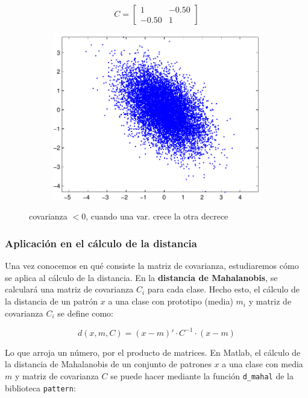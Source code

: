 \documentclass[11pt]{scrartcl}
\begin{document}
\begin{figure}[h!]
 \centering
 \begin{subfigure}{0.49\textwidth}
$$
C = \begin{bmatrix}
1    & -0.50 \\
-0.50 & 1   
\end{bmatrix}
$$ 
\end{subfigure}
 \begin{subfigure}{0.39\textwidth}
    \includegraphics[width=\textwidth]{img/matriz_covarianza_decreciente}
 \end{subfigure}
 \caption{covarianza $< 0$, cuando una var. crece la otra decrece}
\end{figure}

\subsubsection{Aplicación en el cálculo de la distancia}

Una vez conocemos en qué consiste la matriz de covarianza, estudiaremos cómo se
aplica al cálculo de la distancia. En la \textbf{distancia de Mahalanobis}, se
calculará una matriz de covarianza $C_i$ para cada clase. Hecho esto, el cálculo
de la distancia de un patrón $x$ a una clase con prototipo (media) $m_i$ y
matriz de covarianza $C_i$ se define como:

$$
d(x,m,C) = (x-m)' \cdot C^{-1} \cdot (x-m)
$$

Lo que arroja un número, por el producto de matrices. En Matlab, el cálculo de
la distancia de Mahalanobis de un conjunto de patrones $x$ a una clase con media
$m$ y matriz de covarianza $C$ se puede hacer mediante la función
\texttt{d\_mahal} de la biblioteca \texttt{pattern}:
\end{document}
